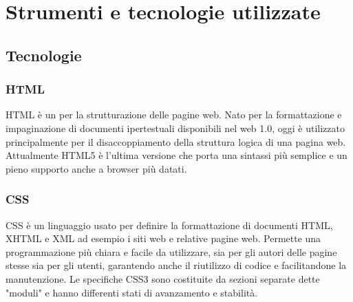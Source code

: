 \begin{comment}
\section{Variazioni}
La creazione di test \g{test e2e} per l'applicazione \emph{mobile} è stata spostata alla quinta settimana per poter verificare anche il funzionamento dei flussi di conversazione implementati per la chat con Azzurra. I test \g{test e2e} per la parte \g{front-end} sono stati regolarmente svolti nella seconda settimana come pianificato. Non è stato possibile effettuare l'implementazione delle \glslink{notifica push}{notifiche push}\textcolor{SchoolColor}{\ap{[g]}} a causa dell'esigenza aziendale di avere già subito implementate le \glslink{notifica push}{notifiche push}\textcolor{SchoolColor}{\ap{[g]}}, che sono quindi state implementante dai membri dell'azienda. In alternativa a ciò ho sviluppato la loro documentazione.
\end{comment}
\section{Strumenti e tecnologie utilizzate}

\subsection{Tecnologie}

\subsubsection*{HTML}
\gls{HTML} è un  per la strutturazione delle pagine web. Nato per la formattazione e impaginazione di documenti ipertestuali disponibili nel web 1.0, oggi è utilizzato principalmente per il disaccoppiamento della struttura logica di una pagina web. Attualmente \gls{HTML}5 è l'ultima versione che porta una sintassi più semplice e un pieno supporto anche a browser più datati.

\subsubsection*{CSS}
\gls{CSS} è un linguaggio usato per definire la formattazione di documenti \gls{HTML}, \gls{XHTML} e \gls{XML} ad esempio i siti web e relative pagine web. Permette una programmazione più chiara e facile da utilizzare, sia per gli autori delle pagine stesse sia per gli utenti, garantendo anche il riutilizzo di codice e facilitandone la manutenzione. Le specifiche \gls{CSS}3 sono costituite da sezioni separate dette "moduli" e hanno differenti stati di avanzamento e stabilità.

